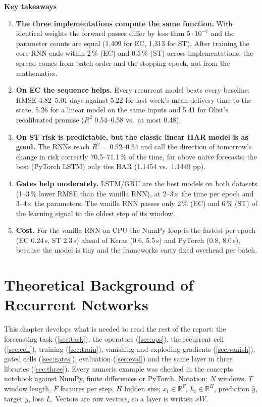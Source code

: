 \documentclass[11pt, a4paper]{article}
\begin{document}
\textbf{Key takeaways}
\begin{enumerate}
\item \textbf{The three implementations compute the same function.} With identical weights the forward passes differ by less than $5\cdot10^{-7}$ and
  the parameter counts are equal (1{,}409 for EC, 1{,}313 for ST). After training the core RNN ends within 2\,\% (EC) and 0.5\,\% (ST) across implementations;
  the spread comes from batch order and the stopping epoch, not from the mathematics.
\item \textbf{On EC the sequence helps.} Every recurrent model beats every baseline: RMSE 4.82--5.01 days against 5.22 for last week's mean delivery time
  to the state, 5.26 for a linear model on the same inputs and 5.41 for Olist's recalibrated promise ($R^2$ 0.54--0.58 vs.\ at most 0.48).
\item \textbf{On ST risk is predictable, but the classic linear HAR model is as good.} The RNNs reach $R^2=0.52$--$0.54$ and call the direction of
  tomorrow's change in risk correctly 70.5--71.1\,\% of the time, far above naive forecasts; the best (PyTorch LSTM) only ties HAR (1.1454 vs.\ 1.1449 pp).
\item \textbf{Gates help moderately.} LSTM/GRU are the best models on both datasets (1--3\,\% lower RMSE than the vanilla RNN), at 2--3$\times$ the time per epoch
  and 3--4$\times$ the parameters. The vanilla RNN passes only 2\,\% (EC) and 6\,\% (ST) of the learning signal to the oldest step of its window.
\item \textbf{Cost.} For the vanilla RNN on CPU the NumPy loop is the fastest per epoch (EC 0.24\,s, ST 2.3\,s) ahead of Keras (0.6, 5.5\,s) and PyTorch (0.8, 8.0\,s),
  because the model is tiny and the frameworks carry fixed overhead per batch.
\end{enumerate}

\section{Theoretical Background of Recurrent Networks}

This chapter develops what is needed to read the rest of the report: the forecasting task (\ref{sec:task}), the operators (\ref{sec:ops}), the recurrent cell
(\ref{sec:cell}), training (\ref{sec:train}), vanishing and exploding gradients (\ref{sec:vanish}), gated cells (\ref{sec:gates}), evaluation (\ref{sec:eval}) and the
same layer in three libraries (\ref{sec:three}). Every numeric example was checked in the concepts notebook against NumPy, finite differences or PyTorch.
Notation: $N$ windows, $T$ window length, $F$ features per step, $H$ hidden size; $x_t\in\mathbb{R}^F$, $h_t\in\mathbb{R}^H$, prediction $\hat y$, target $y$, loss $L$.
Vectors are row vectors, so a layer is written $xW$.
\end{document}
